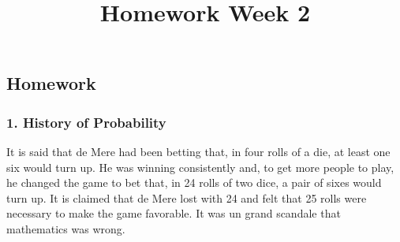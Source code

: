 \documentclass[11pt]{article}
\title{Homework Week 2}
\begin{document}
    
    
    \maketitle
    
    

    
    \hypertarget{homework}{%
\subsection{Homework}\label{homework}}

    \hypertarget{history-of-probability}{%
\subsubsection{1. History of Probability}\label{history-of-probability}}

It is said that de Mere had been betting that, in four rolls of a die,
at least one six would turn up. He was winning consistently and, to get
more people to play, he changed the game to bet that, in 24 rolls of two
dice, a pair of sixes would turn up. It is claimed that de Mere lost
with 24 and felt that 25 rolls were necessary to make the game
favorable. It was un grand scandale that mathematics was wrong.
\end{document}
